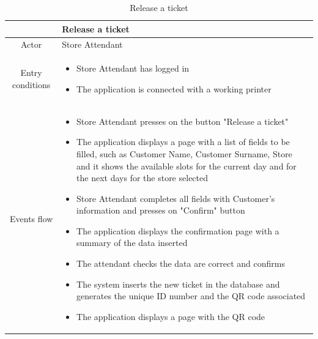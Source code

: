 \documentclass[table, 12pt]{article}
\begin{document}
\begin{minipage}{\textwidth}


    \begin{longtable}{|c| p{10cm}|}
        \caption{Release a ticket}                                                                                                                                                      \\
        \hline
                         & Release a ticket                                                                                                                                             \\
        \hline
        Actor            & Store Attendant                                                                                                                                              \\
        \hline
        Entry conditions & \begin{itemize}
            \item Store Attendant has logged in
            \item The application is connected with a working printer
        \end{itemize}                                                                                                                                   \\
        \hline
        Events flow      & \begin{itemize}[nosep,after=\strut]
            \item Store Attendant presses on the button "Release a ticket"
            \item The application displays a page with a list of fields to be filled, such as Customer Name, Customer Surname, Store and it shows the available slots for the current day and for the next days for the store selected
            \item Store Attendant completes all fields with Customer's information and presses on "Confirm" button
            \item The application displays the confirmation page with a summary of the data inserted
            \item The attendant checks the data are correct and confirms
            \item The system inserts the new ticket in the database and generates the unique ID number and the QR code associated
            \item The application displays a page with the QR code

\end{itemize}
\end{longtable}
\end{minipage}
\end{document}
